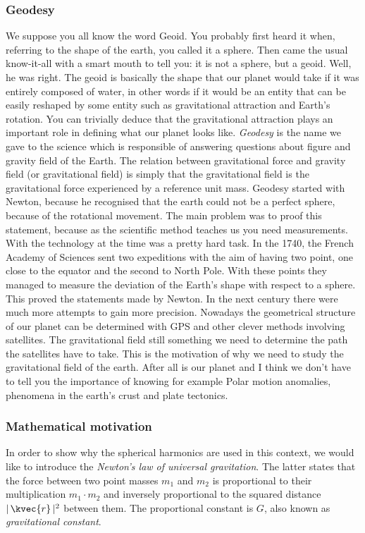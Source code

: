 \subsubsection{Geodesy}
We suppose you all know the word Geoid. You probably first heard it when, referring to the shape of the earth, you called it a sphere. Then came the usual 
know-it-all with a smart mouth to tell you: it is not a sphere, but a geoid. Well, he was right. The geoid is basically the shape that our planet 
would take if it was entirely composed of water, in other words if it would be an entity that can be easily reshaped by some entity such as 
gravitational attraction and Earth’s rotation. You can trivially deduce that the gravitational attraction plays an important role in defining what 
our planet looks like. \emph{Geodesy} is the name we gave to the science which is responsible of answering questions about figure and gravity field 
of the Earth. The relation between gravitational force and gravity field (or gravitational field) is simply that the gravitational field is the gravitational 
force experienced by a reference unit mass. Geodesy started with Newton, because he recognised that the earth could not be a perfect sphere, 
because of the rotational movement. The main problem was to proof this statement, because as the scientific method teaches us you need measurements. 
With the technology at the time was a pretty hard task. In the 1740, the French Academy of Sciences sent two expeditions with the aim of having 
two point, one close to the equator and the second to North Pole. With these points they managed to measure the deviation of the Earth’s shape with 
respect to a sphere. This proved the statements made by Newton. In the next century there were much more attempts to gain more precision. Nowadays the 
geometrical structure of our planet can be determined with GPS and other clever methods involving satellites. The gravitational field still something 
we need to determine the path the satellites have to take. This is the motivation of why we need to study the gravitational field of the earth. 
After all is our planet and I think we don’t have to tell you the importance of knowing for example Polar motion anomalies, phenomena in the earth’s 
crust and plate tectonics.

\subsubsection{Mathematical motivation}
In order to show why the spherical harmonics are used in this context, we would like to introduce the \emph{Newton's law of universal gravitation}. The latter
states that the force between two point masses $m_1$ and $m_2$ is proportional to their multiplication $m_1\cdot m_2$ and inversely proportional to the squared distance $|\,\kvec{r}\,|^2$ 
between them. The proportional constant is $G$, also known as \emph{gravitational constant}. 

